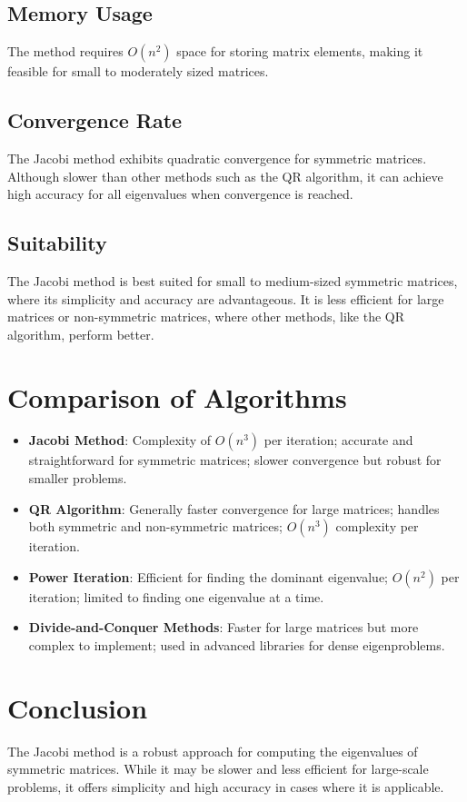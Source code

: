 \documentclass[12pt]{article}
\begin{document}
\subsection{Memory Usage}
The method requires $O(n^2)$ space for storing matrix elements, making it feasible for small to moderately sized matrices.

\subsection{Convergence Rate}
The Jacobi method exhibits quadratic convergence for symmetric matrices. Although slower than other methods such as the QR algorithm, it can achieve high accuracy for all eigenvalues when convergence is reached.

\subsection{Suitability}
The Jacobi method is best suited for small to medium-sized symmetric matrices, where its simplicity and accuracy are advantageous. It is less efficient for large matrices or non-symmetric matrices, where other methods, like the QR algorithm, perform better.

\section{Comparison of Algorithms}
\begin{itemize}
    \item \textbf{Jacobi Method}: Complexity of $O(n^3)$ per iteration; accurate and straightforward for symmetric matrices; slower convergence but robust for smaller problems.
    \item \textbf{QR Algorithm}: Generally faster convergence for large matrices; handles both symmetric and non-symmetric matrices; $O(n^3)$ complexity per iteration.
    \item \textbf{Power Iteration}: Efficient for finding the dominant eigenvalue; $O(n^2)$ per iteration; limited to finding one eigenvalue at a time.
    \item \textbf{Divide-and-Conquer Methods}: Faster for large matrices but more complex to implement; used in advanced libraries for dense eigenproblems.
\end{itemize}

\section{Conclusion}
The Jacobi method is a robust approach for computing the eigenvalues of symmetric matrices. While it may be slower and less efficient for large-scale problems, it offers simplicity and high accuracy in cases where it is applicable.
\end{document}
